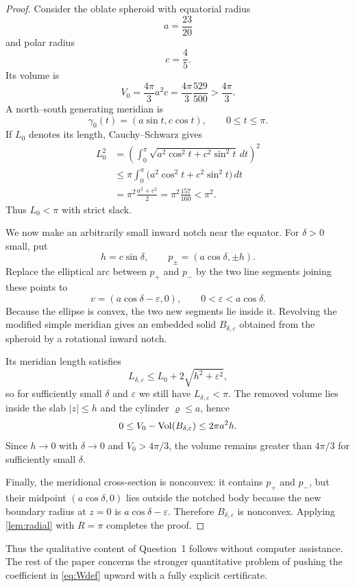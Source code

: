 
\begin{proof}
Consider the oblate spheroid with equatorial radius
\[
a=\frac{23}{20}
\]
and polar radius
\[
c=\frac45.
\]
Its volume is
\[
V_0=\frac{4\pi}{3}a^2c
=\frac{4\pi}{3}\frac{529}{500}
>\frac{4\pi}{3}.
\]
A north--south generating meridian is
\[
\gamma_0(t)=(a\sin t,c\cos t),\qquad 0\le t\le\pi.
\]
If $L_0$ denotes its length, Cauchy--Schwarz gives
\begin{align*}
L_0^2
&=\left(\int_0^\pi
\sqrt{a^2\cos^2t+c^2\sin^2t}\,dt\right)^2\\
&\le \pi\int_0^\pi
\bigl(a^2\cos^2t+c^2\sin^2t\bigr)\,dt\\
&=\pi^2\frac{a^2+c^2}{2}
=\pi^2\frac{157}{160}<\pi^2.
\end{align*}
Thus $L_0<\pi$ with strict slack.

We now make an arbitrarily small inward notch near the equator.  For $\delta>0$ small, put
\[
h=c\sin\delta,
\qquad
p_\pm=(a\cos\delta,\pm h).
\]
Replace the elliptical arc between $p_+$ and $p_-$ by the two line segments joining these points to
\[
v=(a\cos\delta-\varepsilon,0),
\qquad
0<\varepsilon<a\cos\delta.
\]
Because the ellipse is convex, the two new segments lie inside it.  Revolving the modified simple meridian gives an embedded solid $B_{\delta,\varepsilon}$ obtained from the spheroid by a rotational inward notch.

Its meridian length satisfies
\[
L_{\delta,\varepsilon}
\le L_0+2\sqrt{h^2+\varepsilon^2},
\]
so for sufficiently small $\delta$ and $\varepsilon$ we still have $L_{\delta,\varepsilon}<\pi$.  The removed volume lies inside the slab $|z|\le h$ and the cylinder $\varrho\le a$, hence
\[
0\le V_0-\operatorname{Vol}(B_{\delta,\varepsilon})
\le 2\pi a^2h.
\]
Since $h\to0$ with $\delta\to0$ and $V_0>4\pi/3$, the volume remains greater than $4\pi/3$ for sufficiently small $\delta$.

Finally, the meridional cross-section is nonconvex: it contains $p_+$ and $p_-$, but their midpoint $(a\cos\delta,0)$ lies outside the notched body because the new boundary radius at $z=0$ is $a\cos\delta-\varepsilon$.  Therefore $B_{\delta,\varepsilon}$ is nonconvex.  Applying \cref{lem:radial} with $R=\pi$ completes the proof.
\end{proof}

Thus the qualitative content of Question~1 follows without computer assistance.  The rest of the paper concerns the stronger quantitative problem of pushing the coefficient in \eqref{eq:Wdef} upward with a fully explicit certificate.


